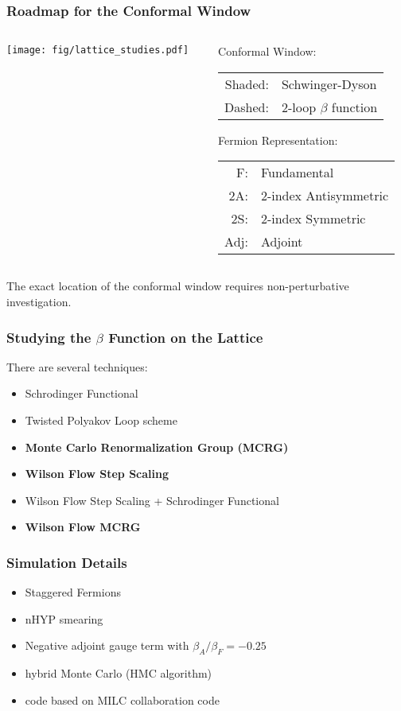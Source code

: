 \begin{frame}
  \frametitle{Roadmap for the Conformal Window}
  \begin{columns}[T]
    \begin{column}{.6\textwidth}
      \texttt{[image: fig/lattice\_studies.pdf]}
    \end{column}
    \begin{column}{.4\textwidth}
      \small
      Conformal Window:
      \begin{tabular}{r l}
        Shaded: & Schwinger-Dyson\\
        Dashed: & 2-loop $\beta$ function
      \end{tabular}
      \vspace{24pt}
      \newline
      Fermion Representation:
      \begin{tabular}{r l}
        F: & Fundamental\\
        2A: & 2-index Antisymmetric\\
        2S: & 2-index Symmetric\\
        Adj: & Adjoint
      \end{tabular}
    \end{column}
  \end{columns}
  \vspace{12pt}
  The exact location of the conformal window requires non-perturbative investigation.
\end{frame}

\begin{frame}
  \frametitle{Studying the $\beta$ Function on the Lattice}
  \begin{center}
    There are several techniques:
  \end{center}
  \begin{itemize}
    \item Schrodinger Functional
    \item Twisted Polyakov Loop scheme
    \item \textbf{Monte Carlo Renormalization Group (MCRG)}
    \item \textbf{Wilson Flow Step Scaling}
    \item Wilson Flow Step Scaling + Schrodinger Functional
    \item \textbf{Wilson Flow MCRG}
  \end{itemize}
\end{frame}

\begin{frame}
  \frametitle{Simulation Details}
  \begin{itemize}
    \item Staggered Fermions
    \item nHYP smearing
    \item Negative adjoint gauge term with $\beta_A/\beta_F=-0.25$
    \item hybrid Monte Carlo (HMC algorithm)
    \item code based on MILC collaboration code
  \end{itemize}
\end{frame}

